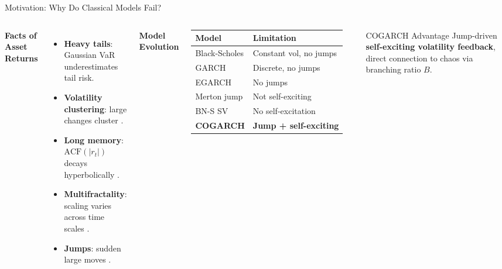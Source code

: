 \documentclass[10pt, aspectratio=169]{beamer}
\begin{document}
\begin{frame}{Motivation: Why Do Classical Models Fail?}
\begin{columns}[T]
  \textbf{Facts of Asset Returns \cite{cont2001empirical}}
  \begin{itemize}\small
    \item \textbf{Heavy tails}: Gaussian VaR underestimates tail risk.
    \item \textbf{Volatility clustering}: large changes cluster
          \cite{engle1982autoregressive}.
    \item \textbf{Long memory}: $\mathrm{ACF}(|r_t|)$ decays
          hyperbolically \cite{peters1994fractal}.
    \item \textbf{Multifractality}: scaling varies across time scales
          \cite{calvet2002multifractality}.
    \item \textbf{Jumps}: sudden large moves
          \cite{merton1976option,duong2010empirical}.
  \end{itemize}
  \textbf{Model Evolution}\\[2pt]
  {\small\begin{tabular}{l l}
    \toprule
    Model & Limitation \\
    \midrule
    Black-Scholes & Constant vol, no jumps \\
    GARCH \cite{bollerslev1986generalized} & Discrete, no jumps \\
    EGARCH \cite{nelson1991conditional} & No jumps \\
    Merton jump \cite{merton1976option} & Not self-exciting \\
    BN-S SV \cite{barndorff2001non} & No self-excitation \\
    \textbf{COGARCH} \cite{kluppelberg2004continuous} & \textbf{Jump + self-exciting} \\
    \bottomrule
  \end{tabular}}
  \vspace{0.15cm}
  \begin{alertblock}{COGARCH Advantage}
    Jump-driven \textbf{self-exciting volatility feedback}, 
    direct connection to chaos via branching ratio $B$.
  \end{alertblock}
\end{columns}
\end{frame}
\end{document}
